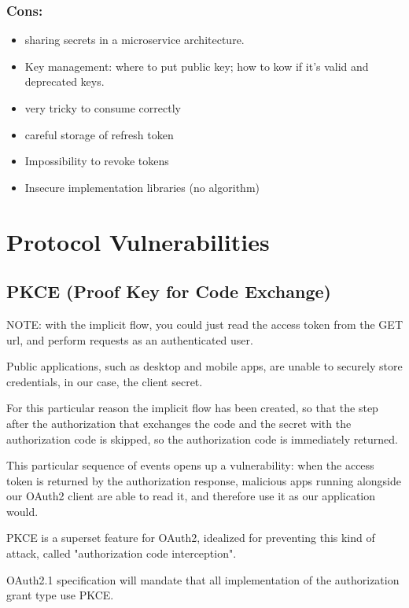 \documentclass[11pt]{style}
\begin{document}
\subsubsection{Cons:}
\begin{itemize}
    \item sharing secrets in a microservice architecture.
    \item Key management: where to put public key; how to kow if it's valid and
        deprecated keys.
    \item very tricky to consume correctly
    \item careful storage of refresh token
    \item Impossibility to revoke tokens
    \item Insecure implementation libraries (no algorithm)
\end{itemize}

\section{Protocol Vulnerabilities}
\subsection{PKCE (Proof Key for Code Exchange)}
\label{pkce}
NOTE: with the implicit flow, you could just read the access token from the GET
url, and perform requests as an authenticated user.

Public applications, such as desktop and mobile apps, are unable to securely
store credentials, in our case, the client secret.

For this particular reason the implicit flow has been created, so
that the step after the authorization that exchanges the code and the secret
with the authorization code is skipped, so the authorization code is immediately
returned.

This particular sequence of events opens up a vulnerability:
when the access token is returned by the authorization response, malicious apps
running alongside our OAuth2 client are able to read it, and therefore use it as
our application would.

PKCE is a superset feature for OAuth2, idealized for preventing this kind of
attack, called "authorization code interception".

OAuth2.1 specification will mandate that all implementation of the authorization
grant type use PKCE.
\end{document}
